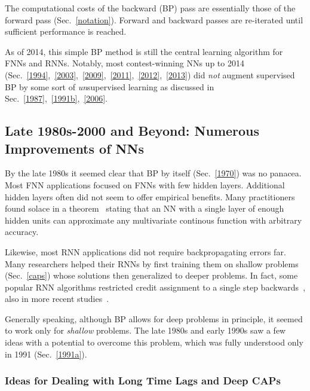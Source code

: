 \documentclass[letterpaper]{article}
\begin{document}
\begin{CJK*}{UTF8}{gbsn}
The computational costs of the backward (BP) pass are essentially those of the forward pass
(Sec.~\ref{notation}).
Forward and backward passes are re-iterated until sufficient performance is reached.

As of 2014, this simple BP method is still the central learning algorithm for FNNs and RNNs.
Notably,
most contest-winning NNs up to 2014 (Sec.~\ref{1994},~\ref{2003},~\ref{2009},~\ref{2011},~\ref{2012},~\ref{2013})
did {\em not} augment supervised BP by 
some sort of {\em un}supervised learning as discussed in Sec.~\ref{1987},~\ref{1991b},~\ref{2006}.

\subsection{Late 1980s-2000 and Beyond: Numerous Improvements of NNs}
\label{1990}


By the late 1980s it seemed clear that BP by itself (Sec.~\ref{1970}) was no panacea.
Most FNN applications focused on FNNs with few hidden layers.
Additional hidden layers often did not seem to offer empirical benefits.
Many practitioners found solace in a theorem~\citep{Kolmogorov:57,hecht1989,hornik1989}
stating that an NN with a single layer of enough hidden units 
can approximate any multivariate continous function
with arbitrary accuracy.



Likewise, most RNN applications 
did not require backpropagating errors far. 
Many researchers helped their RNNs by first 
training them on shallow problems (Sec.~\ref{caps})
whose solutions then generalized to deeper problems.  
In fact, some popular RNN algorithms restricted credit 
assignment to a single step backwards~\citep{elman1990,Jordan:86,jordan1997},
also in more recent studies~\citep{Jaeger2001a,maass2002,Jaeger:04}. 

Generally speaking, although BP allows for deep problems in principle,
it seemed to work only for {\em shallow} problems.  
The late 1980s and early 1990s saw a few ideas 
with a potential to overcome this problem,
which was fully understood only in 1991 (Sec.~\ref{1991a}).




\subsubsection{Ideas for Dealing with Long Time Lags and Deep CAPs}
\label{timelags}


\end{CJK*}
\end{document}
